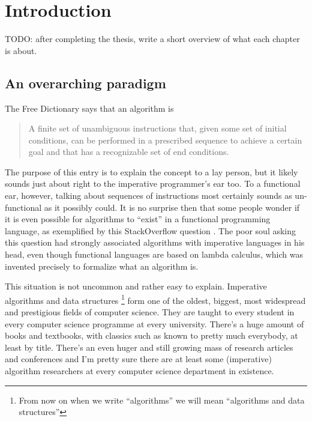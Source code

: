 \documentclass[declaration,mgr,english,shortabstract]{iithesis}
\author         {Wojciech Kołowski}
\date           {Czerwiec '20 chyba że koronawirus}                     %
\begin{document}

\chapter{Introduction} \label{ch1}

TODO: after completing the thesis, write a short overview of what each chapter is about.

\section{An overarching paradigm}

The Free Dictionary says \cite{TheFreeDictionary} that an algorithm is

\begin{quote}
    A finite set of unambiguous instructions that, given some set of initial conditions, can be performed in a prescribed sequence to achieve a certain goal and that has a recognizable set of end conditions.
\end{quote}

The purpose of this entry is to explain the concept to a lay person, but it likely sounds just about right to the imperative programmer's ear too. To a functional ear, however, talking about sequences of instructions most certainly sounds as un-functional as it possibly could. It is no surprise then that some people wonder if it is even possible for algorithms to ``exist'' in a functional programming language, as exemplified by this StackOverflow question \cite{SO}. The poor soul asking this question had strongly associated algorithms with imperative languages in his head, even though functional languages are based on lambda calculus, which was invented precisely to formalize what an algorithm is.

This situation is not uncommon and rather easy to explain. Imperative algorithms and data structures \footnote{From now on when we write ``algorithms'' we will mean ``algorithms and data structures''} form one of the oldest, biggest, most widespread and prestigious fields of computer science. They are taught to every student in every computer science programme at every university. There's a huge amount of books and textbooks, with classics such as \cite{CLRS} \cite{TAOCP} known to pretty much everybody, at least by title. There's an even huger and still growing mass of research articles and conferences and I'm pretty sure there are at least some (imperative) algorithm researchers at every computer science department in existence.
\end{document}
